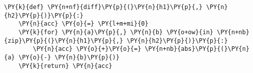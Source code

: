 \begin{Verbatim}[commandchars=\\\{\}]
\PY{k}{def} \PY{n+nf}{diff}\PY{p}{(}\PY{n}{h1}\PY{p}{,} \PY{n}{h2}\PY{p}{)}\PY{p}{:}
    \PY{n}{acc} \PY{o}{=} \PY{l+m+mi}{0}
    \PY{k}{for} \PY{n}{a}\PY{p}{,} \PY{n}{b} \PY{o+ow}{in} \PY{n+nb}{zip}\PY{p}{(}\PY{n}{h1}\PY{p}{,} \PY{n}{h2}\PY{p}{)}\PY{p}{:}
        \PY{n}{acc} \PY{o}{+}\PY{o}{=} \PY{n+nb}{abs}\PY{p}{(}\PY{n}{a} \PY{o}{-} \PY{n}{b}\PY{p}{)}
    \PY{k}{return} \PY{n}{acc}
\end{Verbatim}
